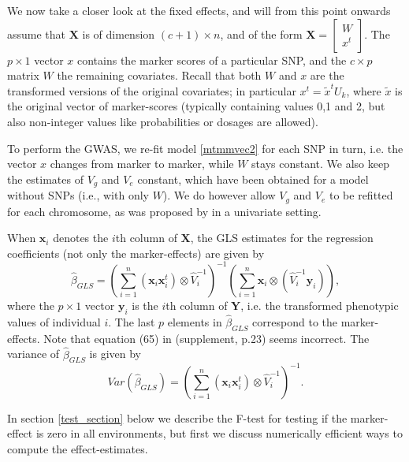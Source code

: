 \documentclass[12pt]{article}
\begin{document}
We now take a closer look at the fixed effects, and will from this point onwards assume that $\mathbf{X}$ is of dimension $(c+1) \times n$, and of the form $\mathbf{X} = \left[\begin{array}{c}
W \\ x^t
\end{array}\right]$. %
The $p \times 1$ vector $x$ contains the marker scores of a particular SNP, and the $c \times p$ matrix $W$ the remaining covariates.
Recall that both $W$ and $x$ are the transformed versions of the original covariates; in particular $x^t = \tilde x^t U_k$, where $\tilde x$ is the original vector of marker-scores (typically containing values 0,1 and 2, but also non-integer values like probabilities or dosages are allowed).

To perform the GWAS, we re-fit model \eqref{mtmmvec2} for each SNP in turn, i.e. the vector $x$ changes from marker to marker, while $W$ stays constant. We also keep the estimates of $V_g$ and $V_e$ constant, which have been obtained for a model without SNPs (i.e., with only $W$). We do however allow  $V_g$ and $V_e$ to be refitted for each chromosome, as was proposed by \cite{rincent_etal_2014} in a univariate setting.


When $\mathbf{x}_i$ denotes the $i$th column of $\mathbf{X}$, the GLS estimates for the regression coefficients (not only the marker-effects) are given by
\begin{equation} \label{gls1}
\hat \beta_{GLS} = \left(\sum_{i=1}^n (\mathbf{x}_i \mathbf{x}_i^t) \otimes \hat V_i^{-1} \right)^{-1}
\left( \sum_{i=1}^n \mathbf{x}_i \otimes (\hat V_i^{-1} \mathbf{y}_i)\right),
%
\end{equation}
where the $p \times 1$ vector $\mathbf{y}_i$ is the $i$th column of $\mathbf{Y}$, i.e. the transformed phenotypic values of individual $i$.
The last $p$ elements in $\hat \beta_{GLS}$ correspond to the marker-effects. Note that equation (65) in \cite{zhou_stephens_2014} (supplement, p.23) seems incorrect. The variance of $\hat \beta_{GLS}$ is given by
\begin{equation*}
Var (\hat \beta_{GLS}) = \left(\sum_{i=1}^n (\mathbf{x}_i \mathbf{x}_i^t) \otimes \hat V_i^{-1} \right)^{-1}.
\end{equation*}

%
In section \ref{test_section} below we describe the F-test for testing if the marker-effect is zero in all environments, but first we discuss numerically efficient ways to compute the effect-estimates.
\end{document}

